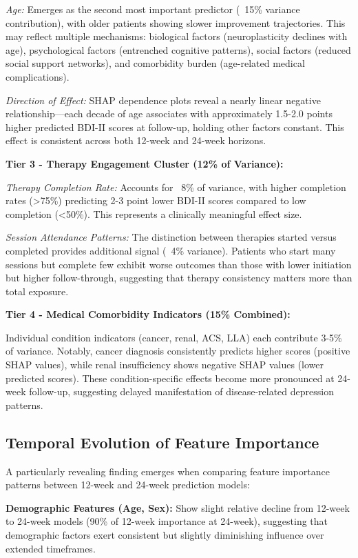 \documentclass[conference]{IEEEtran}
\begin{document}
\textit{Age:} Emerges as the second most important predictor (~15\% variance contribution), with older patients showing slower improvement trajectories. This may reflect multiple mechanisms: biological factors (neuroplasticity declines with age), psychological factors (entrenched cognitive patterns), social factors (reduced social support networks), and comorbidity burden (age-related medical complications).

\textit{Direction of Effect:} SHAP dependence plots reveal a nearly linear negative relationship—each decade of age associates with approximately 1.5-2.0 points higher predicted BDI-II scores at follow-up, holding other factors constant. This effect is consistent across both 12-week and 24-week horizons.

\textbf{Tier 3 - Therapy Engagement Cluster (12\% of Variance):}

\textit{Therapy Completion Rate:} Accounts for ~8\% of variance, with higher completion rates (>75\%) predicting 2-3 point lower BDI-II scores compared to low completion (<50\%). This represents a clinically meaningful effect size.

\textit{Session Attendance Patterns:} The distinction between therapies started versus completed provides additional signal (~4\% variance). Patients who start many sessions but complete few exhibit worse outcomes than those with lower initiation but higher follow-through, suggesting that therapy consistency matters more than total exposure.

\textbf{Tier 4 - Medical Comorbidity Indicators (15\% Combined):}

Individual condition indicators (cancer, renal, ACS, LLA) each contribute 3-5\% of variance. Notably, cancer diagnosis consistently predicts higher scores (positive SHAP values), while renal insufficiency shows negative SHAP values (lower predicted scores). These condition-specific effects become more pronounced at 24-week follow-up, suggesting delayed manifestation of disease-related depression patterns.

\subsection{Temporal Evolution of Feature Importance}

A particularly revealing finding emerges when comparing feature importance patterns between 12-week and 24-week prediction models:

\textbf{Demographic Features (Age, Sex):} Show slight relative decline from 12-week to 24-week models (90\% of 12-week importance at 24-week), suggesting that demographic factors exert consistent but slightly diminishing influence over extended timeframes.
\end{document}
